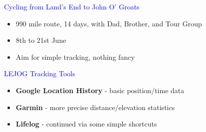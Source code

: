 \documentclass[landscape]{slides}
\begin{document}
\begin{slide}

    \textcolor{blue}{\Large{Cycling from Land's End to John O' Groats}}

    \begin{itemize}
        \item 990 mile route, 14 days, with Dad, Brother, and Tour Group
        \item 8th to 21st June
        \item Aim for simple tracking, nothing fancy
    \end{itemize}

\end{slide}



\begin{slide}

    \textcolor{blue}{\Large{LEJOG Tracking Tools}}

    \begin{itemize}
        \item \textbf{Google Location History} - basic position/time data
        \item \textbf{Garmin} - more precise distance/elevation statistics
        \item \textbf{Lifelog} - continued via some simple shortcuts
    \end{itemize}

\end{slide}
\end{document}
